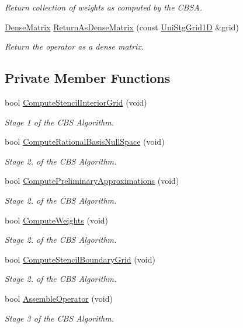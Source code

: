 \begin{DoxyCompactItemize}
\begin{DoxyCompactList}\small\item\em Return collection of weights as computed by the C\-B\-S\-A. \end{DoxyCompactList}\item 
\hyperlink{classmtk_1_1DenseMatrix}{Dense\-Matrix} \hyperlink{classmtk_1_1Grad1D_a75781c4455569a7934d4e0dff7e06064}{Return\-As\-Dense\-Matrix} (const \hyperlink{classmtk_1_1UniStgGrid1D}{Uni\-Stg\-Grid1\-D} \&grid)
\begin{DoxyCompactList}\small\item\em Return the operator as a dense matrix. \end{DoxyCompactList}\end{DoxyCompactItemize}
\subsection*{Private Member Functions}
\begin{DoxyCompactItemize}
\item 
bool \hyperlink{classmtk_1_1Grad1D_ad6df25cc9dfc85ff8562ae3605486976}{Compute\-Stencil\-Interior\-Grid} (void)
\begin{DoxyCompactList}\small\item\em Stage 1 of the C\-B\-S Algorithm. \end{DoxyCompactList}\item 
bool \hyperlink{classmtk_1_1Grad1D_a2d03e6a3961bee558f575ec4099782a9}{Compute\-Rational\-Basis\-Null\-Space} (void)
\begin{DoxyCompactList}\small\item\em Stage 2. of the C\-B\-S Algorithm. \end{DoxyCompactList}\item 
bool \hyperlink{classmtk_1_1Grad1D_add4c68a6e78d8b9c2b800b3f96f4757d}{Compute\-Preliminary\-Approximations} (void)
\begin{DoxyCompactList}\small\item\em Stage 2. of the C\-B\-S Algorithm. \end{DoxyCompactList}\item 
bool \hyperlink{classmtk_1_1Grad1D_a224082617751864bffca9bfe494c36d5}{Compute\-Weights} (void)
\begin{DoxyCompactList}\small\item\em Stage 2. of the C\-B\-S Algorithm. \end{DoxyCompactList}\item 
bool \hyperlink{classmtk_1_1Grad1D_a7ad1cecf6b52647263208ffaea0ee1e5}{Compute\-Stencil\-Boundary\-Grid} (void)
\begin{DoxyCompactList}\small\item\em Stage 2. of the C\-B\-S Algorithm. \end{DoxyCompactList}\item 
bool \hyperlink{classmtk_1_1Grad1D_a4eb4d363506b8c64b2bb18a318bbd259}{Assemble\-Operator} (void)
\begin{DoxyCompactList}\small\item\em Stage 3 of the C\-B\-S Algorithm. \end{DoxyCompactList}\end{DoxyCompactItemize}
